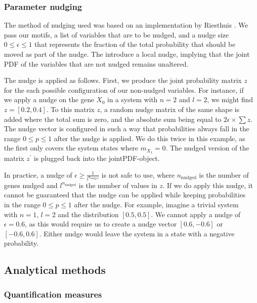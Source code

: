 \documentclass[../main.tex]{subfiles}
\begin{document}
\subsubsection{Parameter nudging}

The method of nudging used was based on an implementation by Riesthuis \cite{DJ_repository}.
We pass our motifs, a list of variables that are to be nudged, and a nudge size $0 \le \epsilon \le 1$ that represents the fraction of the total probability that should be moved as part of the nudge.
The introduce a local nudge, implying that the joint PDF of the variables that are not nudged remains unaltered.

The nudge is applied as follows.
First, we produce the joint probability matrix $z$ for the each possible configuration of our non-nudged variables.
For instance, if we apply a nudge on the gene $X_0$ in a system with $n=2$ and $l=2$, we might find $z = [0.2, 0.4]$.
To this matrix $z$, a random nudge matrix of the same shape is added where the total sum is zero, and the absolute sum being equal to $2 \epsilon \times \sum z$. 
The nudge vector is configured in such a way that probabilities always fall in the range $0 \le p \le 1$ after the nudge is applied.
We do this twice in this example, as the first only covers the system states where $m_{X_1} = 0$.
The nudged version of the matrix $z^\prime$ is plugged back into the jointPDF-object.

In practice, a nudge of $\epsilon \ge \frac{1}{l^{n_\mathrm{nudged}}}$ is not safe to use, where $n_\mathrm{nudged}$ is the number of genes nudged and $l^{n_\mathrm{nudged}}$ is the number of values in $z$.
If we do apply this nudge, it cannot be guaranteed that the nudge can be applied while keeping probabilities in the range $0 \le p \le 1$ after the nudge.
For example, imagine a trivial system with $n = 1$, $l = 2$ and the distribution $[0.5, 0.5]$.
We cannot apply a nudge of $\epsilon = 0.6$, as this would require us to create a nudge vector $[0.6, -0.6]$ or $[-0.6, 0.6]$.
Either nudge would leave the system in a state with a negative probability.

\subsection{Analytical methods}

\subsubsection{Quantification measures}
\end{document}
